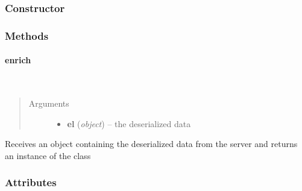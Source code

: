 \documentclass[letterpaper,10pt,english]{sphinxmanual}
\begin{document}
\subsubsection{Constructor}
\label{ambrosia_web.entity:constructor}

\begin{fulllineitems}
\label{ambrosia_web.entity:ambrosia_web.entity}
\end{fulllineitems}



\subsubsection{Methods}
\label{ambrosia_web.entity:methods}

\paragraph{enrich}
\label{ambrosia_web.entity:enrich}

\begin{fulllineitems}
\label{ambrosia_web.entity:ambrosia_web.entity.enrich}~\begin{quote}\begin{description}
\item[{Arguments}] \leavevmode\begin{itemize}
\item {} 
\textbf{el} (\emph{object}) -- the deserialized data

\end{itemize}

\end{description}\end{quote}

\end{fulllineitems}


Receives an object containing the deserialized data from the server and returns an instance of the class
{\hyperref[ambrosia_web.entity.Entity:ambrosia_web.entity.Entity]{}}


\subsubsection{Attributes}
\label{ambrosia_web.entity:attributes}
\end{document}
